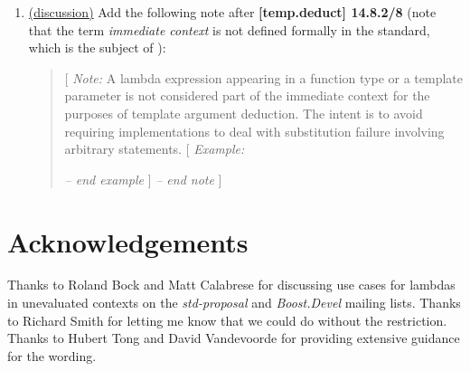\documentclass{wg21}
\begin{document}
\begin{enumerate}
  \item \label{wording.sfinae} \hyperref[discussion.sfinae]{(discussion)}
    Add the following note after \textbf{[temp.deduct] 14.8.2/8} (note that
    the term \textit{immediate context} is not defined formally in the standard,
    which is the subject of \cite{CWG1844}):
    \begin{quote}
      [ \textit{Note:} A lambda expression appearing in a function type or a
      template parameter is not considered part of the immediate context for the
      purposes of template argument deduction. The intent is to avoid requiring
      implementations to deal with substitution failure involving arbitrary
      statements. [ \textit{Example:}
      \textit{-- end example} ]
      \textit{-- end note} ]
    \end{quote}
\end{enumerate}


\section{Acknowledgements}
Thanks to Roland Bock and Matt Calabrese for discussing use cases for lambdas
in unevaluated contexts on the \textit{std-proposal} and \textit{Boost.Devel}
mailing lists. Thanks to Richard Smith for letting me know that we could do
without the restriction. Thanks to Hubert Tong and David Vandevoorde for
providing extensive guidance for the wording.
\end{document}
